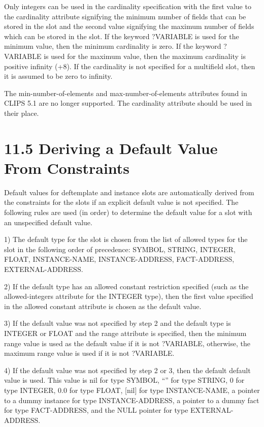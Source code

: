 \documentclass[letterpaper,10pt,english]{sphinxmanual}
\begin{document}
Only integers can be used in the cardinality specification with the
first value to the cardinality attribute signifying the minimum number
of fields that can be stored in the slot and the second value signifying
the maximum number of fields which can be stored in the slot. If the
keyword ?VARIABLE is used for the minimum value, then the minimum
cardinality is zero. If the keyword ?VARIABLE is used for the maximum
value, then the maximum cardinality is positive infinity (+8). If the
cardinality is not specified for a multifield slot, then it is assumed
to be zero to infinity.

The min-number-of-elements and max-number-of-elements attributes found
in CLIPS 5.1 are no longer supported. The cardinality attribute should
be used in their place.


\section{11.5 Deriving a Default Value From Constraints}
\label{\detokenize{constraints:deriving-a-default-value-from-constraints}}
Default values for deftemplate and instance slots are automatically
derived from the constraints for the slots if an explicit default value
is not specified. The following rules are used (in order) to determine
the default value for a slot with an unspecified default value.

1) The default type for the slot is chosen from the list of allowed
types for the slot in the following order of precedence: SYMBOL, STRING,
INTEGER, FLOAT, INSTANCE-NAME, INSTANCE-ADDRESS, FACT-ADDRESS,
EXTERNAL-ADDRESS.

2) If the default type has an allowed constant restriction specified
(such as the allowed-integers attribute for the INTEGER type), then the
first value specified in the allowed constant attribute is chosen as the
default value.

3) If the default value was not specified by step 2 and the default type
is INTEGER or FLOAT and the range attribute is specified, then the
minimum range value is used as the default value if it is not ?VARIABLE,
otherwise, the maximum range value is used if it is not ?VARIABLE.

4) If the default value was not specified by step 2 or 3, then the
default default value is used. This value is nil for type SYMBOL, “” for
type STRING, 0 for type INTEGER, 0.0 for type FLOAT, {[}nil{]} for type
INSTANCE-NAME, a pointer to a dummy instance for type INSTANCE-ADDRESS,
a pointer to a dummy fact for type FACT-ADDRESS, and the NULL pointer
for type EXTERNAL-ADDRESS.
\end{document}
